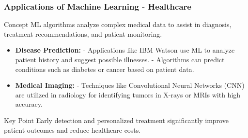 \documentclass[aspectratio=169]{beamer}
\begin{document}
\begin{frame}[fragile]
    \frametitle{Applications of Machine Learning - Healthcare}
    \begin{block}{Concept}
        ML algorithms analyze complex medical data to assist in diagnosis, treatment recommendations, and patient monitoring.
    \end{block}
    \begin{itemize}
        \item \textbf{Disease Prediction:} 
            - Applications like IBM Watson use ML to analyze patient history and suggest possible illnesses. 
            - Algorithms can predict conditions such as diabetes or cancer based on patient data.
        \item \textbf{Medical Imaging:} 
            - Techniques like Convolutional Neural Networks (CNN) are utilized in radiology for identifying tumors in X-rays or MRIs with high accuracy.
    \end{itemize}
    \begin{block}{Key Point}
        Early detection and personalized treatment significantly improve patient outcomes and reduce healthcare costs.
    \end{block}
\end{frame}
\end{document}
